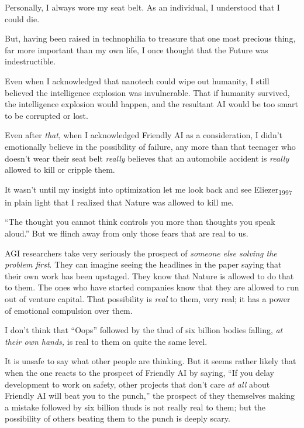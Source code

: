 {
 Personally, I always wore my seat belt. As an individual, I
understood that I could die.}

{
 But, having been raised in technophilia to treasure that one most
precious thing, far more important than my own life, I once thought
that the Future was indestructible.}

{
 Even when I acknowledged that nanotech could wipe out humanity, I
still believed the intelligence explosion was invulnerable. That if
humanity survived, the intelligence explosion would happen, and the
resultant AI would be too smart to be corrupted or lost.}

{
 Even after \textit{that}, when I acknowledged Friendly AI as a
consideration, I didn't emotionally believe in the
possibility of failure, any more than that teenager who
doesn't wear their seat belt \textit{really} believes
that an automobile accident is \textit{really} allowed to kill or
cripple them.}

{
 It wasn't until my insight into optimization let
me look back and see Eliezer\textsubscript{1997} in plain light that I
realized that Nature was allowed to kill me.}

{
 ``The thought you cannot think controls you more
than thoughts you speak aloud.'' But we flinch away
from only those fears that are real to us.}

{
 AGI researchers take very seriously the prospect of
\textit{someone else solving the problem first}. They can imagine
seeing the headlines in the paper saying that their own work has been
upstaged. They know that Nature is allowed to do that to them. The ones
who have started companies know that they are allowed to run out of
venture capital. That possibility is \textit{real} to them, very real;
it has a power of emotional compulsion over them.}

{
 I don't think that
``Oops'' followed by the thud of six
billion bodies falling, \textit{at their own hands,} is real to them on
quite the same level.}

{
 It is unsafe to say what other people are thinking. But it seems
rather likely that when the one reacts to the prospect of Friendly AI
by saying, ``If you delay development to work on
safety, other projects that don't care \textit{at all}
about Friendly AI will beat you to the punch,'' the
prospect of they themselves making a mistake followed by six billion
thuds is not really real to them; but the possibility of others beating
them to the punch is deeply scary.}

